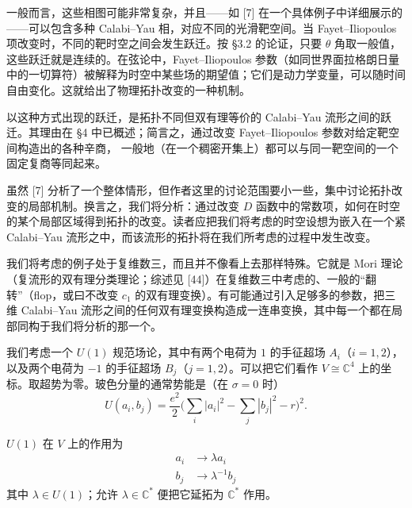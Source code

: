 一般而言，这些相图可能非常复杂，并且——如 [7] 在一个具体例子中详细展示的——可以包含多种 Calabi--Yau 相，对应不同的光滑靶空间。当 Fayet--Iliopoulos 项改变时，不同的靶时空之间会发生跃迁。按 §3.2 的论证，只要 $\theta$ 角取一般值，这些跃迁就是连续的。在弦论中，Fayet--Iliopoulos 参数（如同世界面拉格朗日量中的一切算符）被解释为时空中某些场的期望值；它们是动力学变量，可以随时间自由变化。这就给出了物理拓扑改变的一种机制。

以这种方式出现的跃迁，是拓扑不同但双有理等价的 Calabi--Yau 流形之间的跃迁。其理由在 §4 中已概述；简言之，通过改变 Fayet--Iliopoulos 参数对给定靶空间构造出的各种辛商，
\label{op:67}
一般地（在一个稠密开集上）都可以与同一靶空间的一个固定复商等同起来。

虽然 [7] 分析了一个整体情形，但作者这里的讨论范围要小一些，集中讨论拓扑改变的局部机制。换言之，我们将分析：通过改变 $D$ 函数中的常数项，如何在时空的某个局部区域得到拓扑的改变。读者应把我们将考虑的时空设想为嵌入在一个紧 Calabi--Yau 流形之中，而该流形的拓扑将在我们所考虑的过程中发生改变。

我们将考虑的例子处于复维数三，而且并不像看上去那样特殊。它就是 Mori 理论（复流形的双有理分类理论；综述见 [44]）在复维数三中考虑的、一般的“翻转”（flop，或曰不改变 $c_{1}$ 的双有理变换）。有可能通过引入足够多的参数，把三维 Calabi--Yau 流形之间的任何双有理变换构造成一连串变换，其中每一个都在局部同构于我们将分析的那一个。

我们考虑一个 $U(1)$ 规范场论，其中有两个电荷为 $1$ 的手征超场 $A_{i}$（$i=1,2$），以及两个电荷为 $-1$ 的手征超场 $B_{j}$（$j=1,2$）。可以把它们看作 $V\cong\mathbb{C}^{4}$ 上的坐标。取超势为零。玻色分量的通常势能是（在 $\sigma=0$ 时）
\begin{equation}
\tag{5.37}
U(a_{i},b_{j})=\frac{e^{2}}{2}\Biggl(\sum_{i}|a_{i}|^{2}-\sum_{j}|b_{j}|^{2}-r\Biggr)^{2}.
\end{equation}

$U(1)$ 在 $V$ 上的作用为
\begin{equation}
\tag{5.38}
\begin{aligned}
a_{i}&\to\lambda a_{i}\\
b_{j}&\to\lambda^{-1}b_{j}
\end{aligned}
\end{equation}
其中 $\lambda\in U(1)$；允许 $\lambda\in\mathbb{C}^{*}$ 便把它延拓为 $\mathbb{C}^{*}$ 作用。


